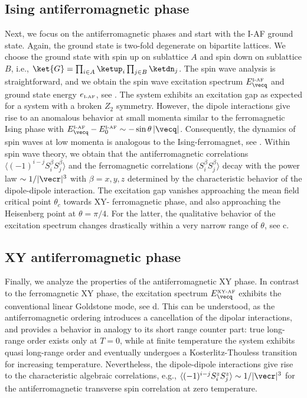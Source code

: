 \subsection{Ising antiferromagnetic phase}
Next, we focus on the antiferromagnetic phases and start with the I-AF ground state.
Again, the ground state is two-fold degenerate on bipartite lattices. We choose the ground state with spin up on sublattice $A$
and spin down on sublattice $B$, i.e., $\ket{G} = \prod_{i \in A} \ketup_{i} \prod_{j\in B} \ketdn_{j}$.
The spin wave analysis is straightforward, and we obtain
the spin wave excitation spectrum $ E^{\mbox{\tiny I-AF}}_{\vecq}$ and ground state energy $ e_{\mbox{\tiny I-AF}}$, see .
The system exhibits an excitation gap as expected for a system with a broken $Z_{2}$ symmetry.
However, the dipole interactions give rise to an anomalous behavior at small momenta similar to
the ferromagnetic Ising phase with $E^{\mbox{\tiny I-AF}}_{\vecq}- E^{\mbox{\tiny I-AF}}_{0} \sim -
\sin \theta\, |{\vecq}|$. Consequently, the dynamics of spin waves at low momenta is analogous to the
Ising-ferromagnet, see . Within spin wave theory, we obtain that the antiferromagnetic correlations
$\langle (-1)^{i-j} S_{i}^{\beta}S_{j}^{\beta} \rangle$
and the ferromagnetic correlations $\langle S_{i}^{\beta}S_{j}^{\beta} \rangle$ decay with the
power law $\sim1/ |{\vecr}|^{3}$ with $\beta = x,y,z$ determined by the characteristic behavior of the dipole-dipole interaction.
The excitation gap vanishes approaching the mean field critical point $\theta_{c}$ towards XY- ferromagnetic
phase, and also approaching the Heisenberg point at $\theta = \pi/4$. For the latter, the qualitative behavior of the excitation spectrum
changes drastically within a very narrow range of $\theta$, see c.



\subsection{XY antiferromagnetic phase}
Finally, we analyze the properties of the antiferromagnetic XY phase.
In contrast to the ferromagnetic XY phase, the excitation spectrum $E^{\mbox{\tiny XY-AF}}_{\vecq}$
exhibits the conventional linear Goldstone mode, see d. This can be understood, as the
antiferromagnetic ordering introduces a cancellation of the dipolar interactions, and provides a behavior in analogy to
its short range counter part: true long-range order exists only at $T=0$, while at finite temperature the system
exhibits quasi long-range order and eventually undergoes a Kosterlitz-Thouless transition for increasing temperature.
Nevertheless, the dipole-dipole interactions give rise to the characteristic algebraic correlations, e.g.,
$\langle (-1)^{i-j}S_{i}^{z}S_{j}^{z} \rangle \sim 1/|{\vecr}|^3$ for the antiferromagnetic transverse spin correlation at zero temperature.


